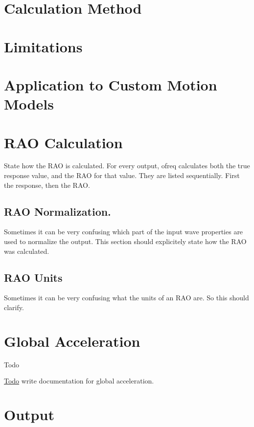 \section*{Calculation Method}

\section*{Limitations}

\section*{Application to Custom Motion Models}

\section*{R\-A\-O Calculation}

State how the R\-A\-O is calculated. For every output, ofreq calculates both the true response value, and the R\-A\-O for that value. They are listed sequentially. First the response, then the R\-A\-O.

\subsection*{R\-A\-O Normalization.}

Sometimes it can be very confusing which part of the input wave properties are used to normalize the output. This section should explicitely state how the R\-A\-O was calculated.

\subsection*{R\-A\-O Units}

Sometimes it can be very confusing what the units of an R\-A\-O are. So this should clarify. \hypertarget{global_acceleration}{}\section{Global Acceleration}\label{global_acceleration}
\begin{DoxyRefDesc}{Todo}
\item[\hyperlink{todo__todo000012}{Todo}]write documentation for global acceleration.\end{DoxyRefDesc}


\section*{Output}

